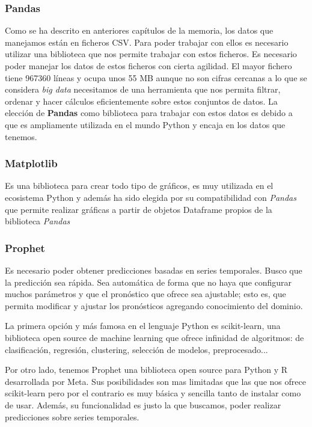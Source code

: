 \subsubsection{Pandas}
Como se ha descrito en anteriores capítulos de la memoria, los datos que manejamos están en ficheros CSV. Para poder trabajar con ellos es necesario utilizar una biblioteca que nos permite trabajar con estos ficheros. Es necesario poder manejar los datos de estos ficheros con cierta agilidad. El mayor fichero tiene 967360 líneas y ocupa unos 55 MB aunque no son cifras cercanas a lo que se considera \textit{big data} necesitamos de una herramienta que nos permita filtrar, ordenar y hacer cálculos eficientemente sobre estos conjuntos de datos. La elección de \textbf{Pandas} como biblioteca para trabajar con estos datos es debido a que es ampliamente utilizada en el mundo Python y encaja en los datos que tenemos.

\subsubsection{Matplotlib}
Es una biblioteca para crear todo tipo de gráficos, es muy utilizada en el ecosistema Python y además ha sido elegida por su compatibilidad con \textit{Pandas} que permite realizar gráficas a partir de objetos Dataframe propios de la biblioteca \textit{Pandas}

\subsubsection{Prophet}
Es necesario poder obtener predicciones basadas en series temporales. Busco que la predicción sea rápida. Sea automática de forma que no haya que configurar muchos parámetros y que el pronóstico que ofrece sea ajustable; esto es, que permita modificar y ajustar los pronósticos agregando conocimiento del dominio.

La primera opción y más famosa en el lenguaje Python es scikit-learn, una biblioteca open source de machine learning que ofrece infinidad de algoritmos: de clasificación, regresión, clustering, selección de modelos, preprocesado...

Por otro lado, tenemos Prophet una biblioteca open source para Python y R desarrollada por Meta. Sus posibilidades son mas limitadas que las que nos ofrece scikit-learn pero por el contrario es muy básica y sencilla tanto de instalar como de usar. Además, su funcionalidad es justo la que buscamos, poder realizar predicciones sobre series temporales.

